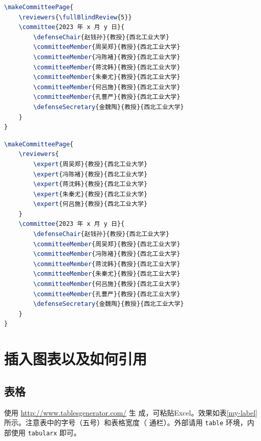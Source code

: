 \documentclass[lang=chs, degree=master, blindreview=false, adobe=false]{yanputhesis}
\begin{document}
\begin{lstlisting}[language={TeX}, label={code:makeBlindReviewerCommitteePage},
    caption={盲评样例 makeBlindReviewerCommitteePage.tex}]
\makeCommitteePage{
    \reviewers{\fullBlindReview{5}}
    \committee{2023 年 x 月 y 日}{
        \defenseChair{赵钱孙}{教授}{西北工业大学}
        \committeeMember{周吴郑}{教授}{西北工业大学}
        \committeeMember{冯陈褚}{教授}{西北工业大学}
        \committeeMember{蒋沈韩}{教授}{西北工业大学}
        \committeeMember{朱秦尤}{教授}{西北工业大学}
        \committeeMember{何吕施}{教授}{西北工业大学}
        \committeeMember{孔曹严}{教授}{西北工业大学}
        \defenseSecretary{金魏陶}{教授}{西北工业大学}
    }
}
\end{lstlisting}

\begin{lstlisting}[language={TeX}, label={code:makeOpenReviewerCommitteePage},
    caption={明审样例 makeOpenReviewerCommitteePage.tex}]
\makeCommitteePage{
    \reviewers{
        \expert{周吴郑}{教授}{西北工业大学}
        \expert{冯陈褚}{教授}{西北工业大学}
        \expert{蒋沈韩}{教授}{西北工业大学}
        \expert{朱秦尤}{教授}{西北工业大学}
        \expert{何吕施}{教授}{西北工业大学}
    }
    \committee{2023 年 x 月 y 日}{
        \defenseChair{赵钱孙}{教授}{西北工业大学}
        \committeeMember{周吴郑}{教授}{西北工业大学}
        \committeeMember{冯陈褚}{教授}{西北工业大学}
        \committeeMember{蒋沈韩}{教授}{西北工业大学}
        \committeeMember{朱秦尤}{教授}{西北工业大学}
        \committeeMember{何吕施}{教授}{西北工业大学}
        \committeeMember{孔曹严}{教授}{西北工业大学}
        \defenseSecretary{金魏陶}{教授}{西北工业大学}
    }
}
\end{lstlisting}

\cleardoublepage

\chapter{插入图表以及如何引用}

\section{表格}

使用 \href{http://www.tablesgenerator.com/}{http://www.tablesgenerator.com/} 生
成，可粘贴Excel。效果如表\ref{my-label}所示。注意表中的字号（五号）和表格宽度（
通栏）。外部请用 \lstinline`table` 环境，内部使用 \lstinline`tabularx` 即可。
\end{document}
